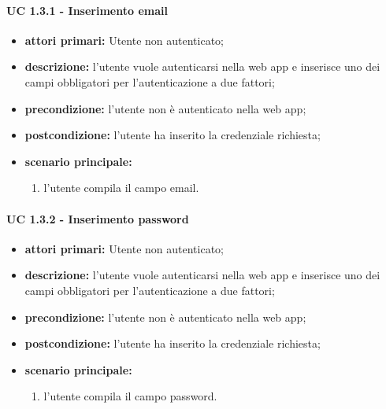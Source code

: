 			\paragraph{UC 1.3.1 - Inserimento email}
			\begin{itemize}
				\item \textbf{attori primari:} Utente non autenticato;
				\item \textbf{descrizione:} l'utente vuole autenticarsi nella web app e inserisce uno dei campi obbligatori per l'autenticazione a due fattori;
				\item \textbf{precondizione:} l'utente non è autenticato nella web app;
				\item \textbf{postcondizione:} l'utente ha inserito la credenziale richiesta;
				\item \textbf{scenario principale:}
				\begin{enumerate}
					\item l'utente compila il campo email.
				\end{enumerate}	
			\end{itemize}

			\paragraph{UC 1.3.2 - Inserimento password}
			\begin{itemize}
				\item \textbf{attori primari:} Utente non autenticato;
				\item \textbf{descrizione:} l'utente vuole autenticarsi nella web app e inserisce uno dei campi obbligatori per l'autenticazione a due fattori;
				\item \textbf{precondizione:} l'utente non è autenticato nella web app;
				\item \textbf{postcondizione:} l'utente ha inserito la credenziale richiesta;
				\item \textbf{scenario principale:}
				\begin{enumerate}
					\item l'utente compila il campo password.
				\end{enumerate}	
			\end{itemize}

